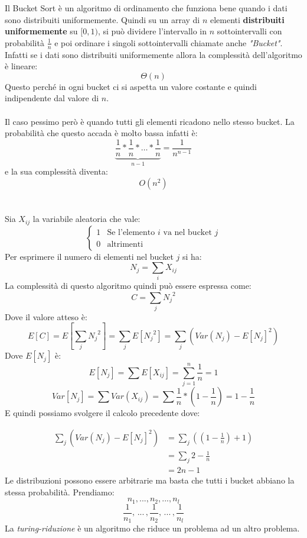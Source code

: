 \documentclass[a4paper]{article}
\begin{document}
Il Bucket Sort è un algoritmo di ordinamento che funziona bene quando i dati sono distribuiti uniformemente. Quindi
su un array di $n$ elementi \textbf{distribuiti uniformemente} su $[0, 1)$, si può dividere l'intervallo in $n$ sottointervalli
con probabilità $\frac{1}{n}$ e poi ordinare i singoli sottointervalli chiamate anche \textit{"Bucket"}.
Infatti se i dati sono distribuiti uniformemente allora la complessità dell'algoritmo è lineare: \[\Theta(n)\]Questo
perché in ogni bucket ci si aspetta un valore costante e quindi indipendente dal valore di $n$.
\\\\Il caso pessimo però è quando tutti gli elementi ricadono nello stesso bucket. La probabilità che questo accada è molto bassa
infatti è: \[\underbrace{\frac{1}{n} \ast \frac{1}{n} \ast \dots \ast \frac{1}{n}}_{n-1}  = \frac{1}{n^{n-1}}\]e la sua complessità diventa: \[O(n^2)\]
\\\\
Sia \(X_{ij}\) la variabile aleatoria che vale:
\[
\begin{cases}
  1 & \text{Se l'elemento } i \text{ va nel bucket } j\\
  0 & \text{altrimenti}
\end{cases}
\]
Per esprimere il numero di elementi nel bucket $j$ si ha:
\[
  N_j = \sum_{i} X_{ij}
\]
La complessità di questo algoritmo quindi può essere espressa come:
\[
  C = \sum_j {N_j}^2
\]
Dove il valore atteso è:
\[E[C] = E\left[ \sum_j {N_j}^2\right] = \sum_j E[{N_j}^2] = \sum_j\left(Var(N_j) - E[N_j]^2\right)\]
Dove $E[N_j]$ è:
\[E[N_j] = \sum E[X_{ij}] = \sum_{j=1}^n \frac{1}{n} = 1\]
\[Var[N_j] = \sum Var(X_{ij}) = \sum \frac{1}{n} * \left(1 - \frac{1}{n}\right) = 1 - \frac{1}{n}\]
E quindi possiamo svolgere il calcolo precedente dove:

\begin{align*}
  \sum_j \left(Var(N_j) - E[N_j]^2\right) &=  \sum_j \left(\left(1 - \frac{1}{n}\right) + 1\right) \\ &= \sum_j 2 - \frac{1}{n}\\  &= 2n - 1
\end{align*}
Le distribuzioni possono essere arbitrarie ma basta che tutti i bucket abbiano la stessa probabilità.
Prendiamo:
\[n_1, ..., n_2, ... , n_l\]
\[\frac{1}{n_1}, \, ... \,  , \frac{1}{n_2}, \, ... \, , \frac{1}{n_l}\]
La \textit{turing-riduzione} è un algoritmo che riduce un problema ad un altro problema.
\end{document}
